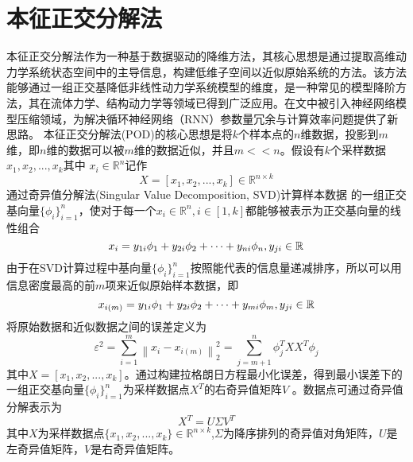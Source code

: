 \section{本征正交分解法}
本征正交分解法\cite{nomura1993structure}作为一种基于数据驱动的降维方法，其核心思想是通过提取高维动力学系统状态空间中的主导信息，构建低维子空间以近似原始系统的方法。该方法能够通过一组正交基降低非线性动力学系统模型的维度，是一种常见的模型降阶方法，其在流体力学、结构动力学等领域已得到广泛应用。在文中被引入神经网络模型压缩领域，为解决循环神经网络（RNN）参数量冗余与计算效率问题提供了新思路。
本征正交分解法(POD)的核心思想是将$k$个样本点的$n$维数据，投影到$m$维，即$n$维的数据可以被$m$维的数据近似，并且$m<<n$。假设有$k$个采样数据${x_1},{x_2},...,{x_k}$其中 ${x_i}\in \mathbb{R} ^{n}$记作
\begin{equation}
  \label{eq:1}
X = [ {x_1},{x_2},...,{x_k}]  \in \mathbb{R} ^{n \times k}
\end{equation}
通过奇异值分解法(Singular Value Decomposition, SVD)计算样本数据 的一组正交基向量$\{ {\phi _i}\} _{i = 1}^n$，使对于每一个${x_i} \in \mathbb{R}^n,i \in [1,k]$都能够被表示为正交基向量的线性组合
\begin{equation}
  \label{eq:2}
{x_i} = {y_{1i}}{\phi _1} + {y_{2i}}{\phi _2} +  \cdots  + {y_{ni}}{\phi _n},{\rm{ }}{y_{ji}} \in \mathbb{R}
\end{equation}
由于在SVD计算过程中基向量$\{ {\phi _i}\} _{i = 1}^n$按照能代表的信息量递减排序，所以可以用信息密度最高的前$m$项来近似原始样本数据，即
\begin{equation}
  \label{eq:3}
  {x_{i(m)}} = {y_{1i}}{\phi _1} + {y_{2i}}{\phi _2} +  \cdots  + {y_{mi}}{\phi _m},{\rm{ }}{y_{ji}} \in \mathbb{R}
\end{equation}
将原始数据和近似数据之间的误差定义为
\begin{equation}
  \label{eq:4}
{\varepsilon ^2} = \sum\limits_{i = 1}^m {\left\| {{x_i} - {x_{i(m)}}} \right\|_2^2}  = \sum\limits_{j = m + 1}^n {\phi _j^T} X{X^T}{\phi _j}
\end{equation}
其中$X = [ {x_1},{x_2},...,{x_k}] $。通过构建拉格朗日方程最小化误差，得到最小误差下的一组正交基向量$\{ {\phi _i}\} _{i = 1}^n$为采样数据点${X^T}$的右奇异值矩阵$V$ \cite{chatterjee2000introduction}。数据点可通过奇异值分解表示为
\begin{equation}
\label{eq:5}
  {X^T} = U\Sigma  {V^T}
\end{equation}
其中$X$为采样数据点$\{ {x_1},{x_2},...,{x_k}\}  \in {\mathbb{R}^{n \times k}}$,$\Sigma $为降序排列的奇异值对角矩阵，$U$是左奇异值矩阵，$V$是右奇异值矩阵。
